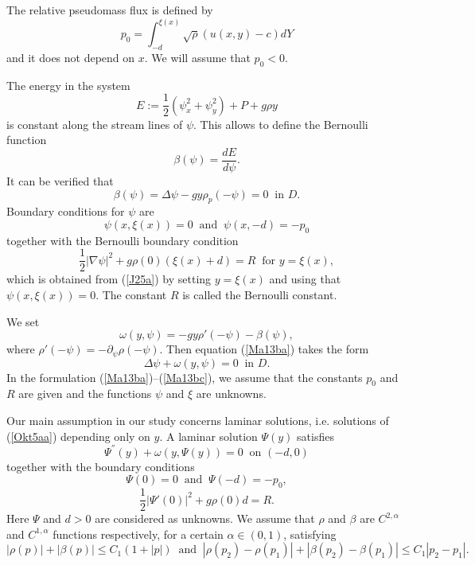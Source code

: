 \documentclass[a4paper,reqno,12pt]{amsart}
\theoremstyle{plain}
\theoremstyle{definition}
\numberwithin{equation}{section}
\begin{document}
The  relative pseudomass flux is defined by
$$
p_0=\int_{-d}^{\xi(x)}\sqrt{\rho}(u(x,y)-c)dY
$$
and it does not depend on $x$. We will assume that $p_0<0$.


The energy in the system
\begin{equation}\label{J25a}
E:=\frac{1}{2}(\psi_x^2+\psi_y^2)+ P+g\rho y
\end{equation}
is constant along the stream lines of $\psi$. This allows  to define
 the Bernoulli function
\begin{equation}\label{Ma13b}
\beta(\psi)=\frac{d E}{d\psi}.
\end{equation}
It can be verified that
\begin{equation}\label{Ma13ba}
\beta (\psi)=\Delta\psi-gy\rho_p(-\psi)=0\;\;\mbox{in $D$}.
\end{equation}
Boundary conditions for $\psi$ are
\begin{equation}\label{Ma13bb}
\psi(x,\xi(x))=0\;\;\mbox{and}\;\;\psi(x,-d)=-p_0
\end{equation}
together with the Bernoulli boundary condition
\begin{equation}\label{Ma13bc}
\frac{1}{2}|\nabla\psi|^2+g\rho(0)(\xi(x)+d)=R\;\;\mbox{for $y=\xi(x)$},
\end{equation}
which is obtained from (\ref{J25a}) by setting $y=\xi(x)$ and using that
$\psi(x,\xi(x))=0$. The constant $R$ is called the Bernoulli constant.

We set
\begin{equation}\label{Okt5a}
\omega(y,\psi)=-gy\rho'(-\psi)-\beta(\psi),
\end{equation}
where $\rho'(-\psi)=-\partial_\psi\rho(-\psi)$.
Then equation (\ref{Ma13ba}) takes the form
\begin{equation}\label{Okt5aa}
\Delta\psi+\omega(y,\psi)=0\;\;\mbox{in $D$}.
\end{equation}
In the formulation (\ref{Ma13ba})--(\ref{Ma13bc}), we assume that the constants $p_0$ and $R$ are given and the functions $\psi$ and $\xi$ are unknowns.

Our main assumption in our study concerns laminar solutions, i.e.
solutions of (\ref{Okt5aa}) depending only on $y$. A laminar solution $\Psi(y)$ satisfies
\begin{equation}\label{J18aa}
\Psi^{''}(y)+\omega(y,\Psi(y))=0\;\;\mbox{on $(-d,0)$}
\end{equation}
together with the boundary conditions
\begin{equation}\label{J18ab}
\Psi(0)=0\;\;\mbox{and}\;\;\Psi(-d)=-p_0,
\end{equation}
\begin{equation}\label{J18ac}
\frac{1}{2}|\Psi'(0)|^2+g\rho(0)d=R.
\end{equation}
Here $\Psi$ and $d>0$ are considered as unknowns.
We assume that $\rho$ and $\beta$  are $C^{2,\alpha}$ and $C^{1,\alpha}$ functions respectively, for a certain $\alpha\in (0,1)$, satisfying
\begin{equation}\label{F11a}
|\rho(p)|+|\beta(p)|\leq C_1(1+|p|)\;\;\mbox{and}\;\;|\rho(p_2)-\rho(p_1)|+|\beta(p_2)-\beta(p_1)|\leq C_1|p_2-p_1|.
\end{equation}
\end{document}
